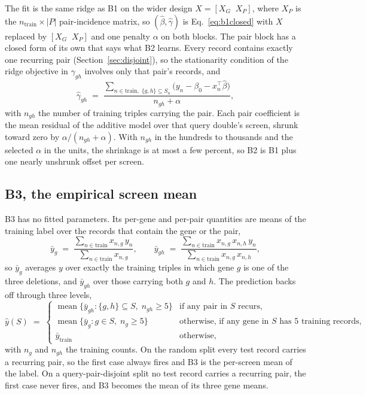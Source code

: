 The fit is the same ridge as B1 on the wider design $X = [X_G \;\; X_P]$, where
$X_P$ is the $n_{\mathrm{train}} \times |P|$ pair-incidence matrix, so
$(\hat{\beta}, \hat{\gamma})$ is Eq.~\ref{eq:b1closed} with $X$ replaced by
$[X_G \;\; X_P]$ and one penalty $\alpha$ on both blocks. The pair block has a
closed form of its own that says what B2 learns. Every record contains exactly
one recurring pair (Section~\ref{sec:disjoint}), so the stationarity condition
of the ridge objective in $\gamma_{gh}$ involves only that pair's records, and
%
\begin{equation}
  \hat{\gamma}_{gh} \;=\; \frac{\sum_{n \in \mathrm{train},\; \{g,h\} \subseteq S_n}
  \bigl(y_n - \beta_0 - x_n^{\top}\hat{\beta}\bigr)}{n_{gh} + \alpha} ,
  \label{eq:b2gamma}
\end{equation}
%
with $n_{gh}$ the number of training triples carrying the pair. Each pair
coefficient is the mean residual of the additive model over that query double's
screen, shrunk toward zero by $\alpha / (n_{gh} + \alpha)$. With $n_{gh}$ in the
hundreds to thousands and the selected $\alpha$ in the units, the shrinkage is
at most a few percent, so B2 is B1 plus one nearly unshrunk offset per screen.

\subsection{B3, the empirical screen mean}
\label{sec:b3}

B3 has no fitted parameters. Its per-gene and per-pair quantities are means of
the training label over the records that contain the gene or the pair,
%
\begin{equation}
  \bar{y}_g \;=\; \frac{\sum_{n \in \mathrm{train}} x_{n,g}\, y_n}{\sum_{n \in \mathrm{train}} x_{n,g}},
  \qquad
  \bar{y}_{gh} \;=\; \frac{\sum_{n \in \mathrm{train}} x_{n,g}\, x_{n,h}\, y_n}{\sum_{n \in \mathrm{train}} x_{n,g}\, x_{n,h}} ,
  \label{eq:b3means}
\end{equation}
%
so $\bar{y}_g$ averages $y$ over exactly the training triples in which gene $g$
is one of the three deletions, and $\bar{y}_{gh}$ over those carrying both $g$
and $h$. The prediction backs off through three levels,
%
\begin{equation}
  \hat{y}(S) \;=\;
  \begin{cases}
    \operatorname{mean}\{\bar{y}_{gh} : \{g,h\} \subseteq S,\; n_{gh} \ge 5\}
      & \text{if any pair in } S \text{ recurs,} \\
    \operatorname{mean}\{\bar{y}_{g} : g \in S,\; n_g \ge 5\}
      & \text{otherwise, if any gene in } S \text{ has 5 training records,} \\
    \bar{y}_{\mathrm{train}} & \text{otherwise,}
  \end{cases}
  \label{eq:b3}
\end{equation}
%
with $n_g$ and $n_{gh}$ the training counts. On the random split every test
record carries a recurring pair, so the first case always fires and B3 is the
per-screen mean of the label. On a query-pair-disjoint split no test record
carries a recurring pair, the first case never fires, and B3 becomes the mean of
its three gene means.

